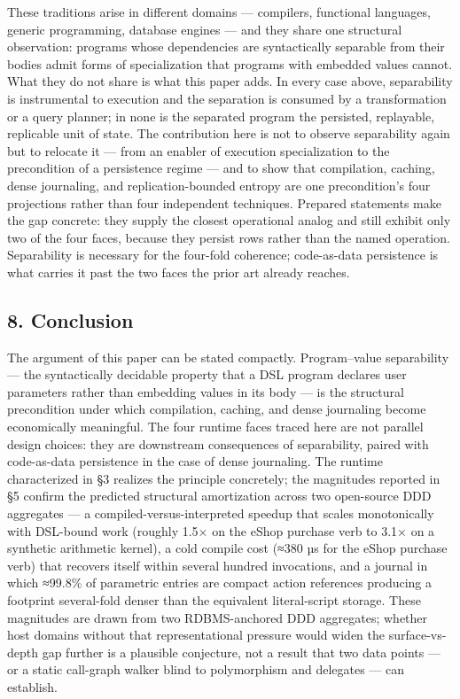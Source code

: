 \documentclass[
]{article}
\newcounter{none} %
\begin{document}
These traditions arise in different domains --- compilers, functional
languages, generic programming, database engines --- and they share one
structural observation: programs whose dependencies are syntactically
separable from their bodies admit forms of specialization that programs
with embedded values cannot. What they do not share is what this paper
adds. In every case above, separability is instrumental to execution and
the separation is consumed by a transformation or a query planner; in
none is the separated program the persisted, replayable, replicable unit
of state. The contribution here is not to observe separability again but
to relocate it --- from an enabler of execution specialization to the
precondition of a persistence regime --- and to show that compilation,
caching, dense journaling, and replication-bounded entropy are one
precondition's four projections rather than four independent techniques.
Prepared statements make the gap concrete: they supply the closest
operational analog and still exhibit only two of the four faces, because
they persist rows rather than the named operation. Separability is
necessary for the four-fold coherence; code-as-data persistence is what
carries it past the two faces the prior art already reaches.

\subsection{8. Conclusion}\label{conclusion}

The argument of this paper can be stated compactly. Program--value
separability --- the syntactically decidable property that a DSL program
declares user parameters rather than embedding values in its body --- is
the structural precondition under which compilation, caching, and dense
journaling become economically meaningful. The four runtime faces traced
here are not parallel design choices: they are downstream consequences
of separability, paired with code-as-data persistence in the case of
dense journaling. The runtime characterized in §3 realizes the principle
concretely; the magnitudes reported in §5 confirm the predicted
structural amortization across two open-source DDD aggregates --- a
compiled-versus-interpreted speedup that scales monotonically with
DSL-bound work (roughly 1.5× on the eShop purchase verb to 3.1× on a
synthetic arithmetic kernel), a cold compile cost (≈380 µs for the eShop
purchase verb) that recovers itself within several hundred invocations,
and a journal in which ≈99.8\% of parametric entries are compact action
references producing a footprint several-fold denser than the equivalent
literal-script storage. These magnitudes are drawn from two
RDBMS-anchored DDD aggregates; whether host domains without that
representational pressure would widen the surface-vs-depth gap further
is a plausible conjecture, not a result that two data points --- or a
static call-graph walker blind to polymorphism and delegates --- can
establish.
\end{document}
